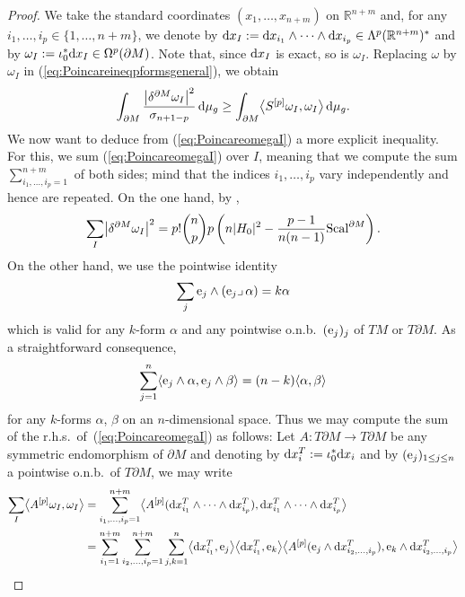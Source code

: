 \begin{proof}
We take the standard coordinates $(x_1,\dots,x_{n+m})$ on $\mathbb{R}^{n+m}$ and, for any $i_1,\dots,i_p\in\{1,\dots,n+m\}$, we denote by ${\rm d}x_I:={\rm d}x_{i_1}\wedge\dots\wedge {\rm d}x_{i_p}\in\Lambda^p(\mathbb{R}^{n+m})^*$ and by $\omega_I:=\iota_0^* {\rm d}x_I\in\Omega^p(\partial M)$. Note that, since ${\rm d}x_I$ is exact, so is $\omega_I$.
Replacing $\omega$ by $\omega_I$ in (\ref{eq:Poincareineqpformsgeneral}), we obtain
\begin{equation}\label{eq:PoincareomegaI}
\int_{\partial M}\frac{\bigl|\delta^{\partial M}\omega_I\bigr|^2}{\sigma_{n+1-p}}\,{\rm d}\mu_g\geq\int_{\partial M}\bigl\langle S^{[p]}\omega_I,\omega_I\bigr\rangle\,{\rm d}\mu_g.
\end{equation}
We now want to deduce from (\ref{eq:PoincareomegaI}) a more explicit i\-ne\-qua\-li\-ty. For this, we sum (\ref{eq:PoincareomegaI}) over $I$, meaning that we compute the sum $\sum_{i_1,\dots,i_p=1}^{n+m}$ of both sides; mind that the indices $i_1,\dots,i_p$ vary independently and hence are repeated. On the one hand, by \cite[Lemma 2.2]{Savo05},
\begin{equation}\label{eq:sumdeltaomegaI2}
\sum_I\bigl|\delta^{\partial M}\omega_I\bigr|^2=p!\binom{n}{p}p\left(n|H_0|^2-\frac{p-1}{n(n-1)}{\rm Scal}^{\partial M}\right).
\end{equation}
On the other hand, we use the pointwise identity
\[\sum_{j}{\rm e}_j\wedge({\rm e}_j\lrcorner\,\alpha)=k\alpha\]
which is valid for any $k$-form $\alpha$ and any pointwise o.n.b.\ $({\rm e}_j)_j$ of $TM$ or $T\partial M$.
As a straightforward consequence,
\begin{equation*}
\sum_{j=1}^n\langle {\rm e}_j\wedge\alpha,{\rm e}_j\wedge\beta\rangle=(n-k)\langle\alpha,\beta\rangle
\end{equation*}
for any $k$-forms $\alpha$, $\beta$ on an $n$-dimensional space. Thus we may compute the sum of the r.h.s.\ of~(\ref{eq:PoincareomegaI}) as follows:  Let $A\colon T\partial M\to T\partial M$ be any symmetric endomorphism of $\partial M$  and denoting by ${\rm d}x_i^T:=\iota_0^*{\rm d}x_i$ and by $({\rm e}_j)_{1\leq j\leq n}$ a pointwise o.n.b.\ of $T\partial M$, we may write
\begin{align}
\sum_I\bigl\langle A^{[p]}\omega_I,\omega_I\bigr\rangle&= \sum_{i_1,\dots,i_p=1}^{n+m}\bigl\langle A^{[p]}({\rm d}x_{i_1}^T\wedge\dots\wedge {\rm d}x_{i_p}^T),{\rm d}x_{i_1}^T\wedge\dots\wedge {\rm d}x_{i_p}^T\bigr\rangle\nonumber\\
&= \sum_{i_1=1}^{n+m}\sum_{i_2,\dots,i_p=1}^{n+m}\sum_{j,k=1}^n\bigl\langle {\rm d}x_{i_1}^T,{\rm e}_j\bigr\rangle\bigl\langle {\rm d}x_{i_1}^T,{\rm e}_k\bigr\rangle\bigl\langle A^{[p]}({\rm e}_j\wedge {\rm d}x_{i_2,\dots,i_p}^T),{\rm e}_k\wedge {\rm d}x_{i_2,\dots,i_p}^T\bigr\rangle\nonumber\\

\end{align}
\end{proof}
